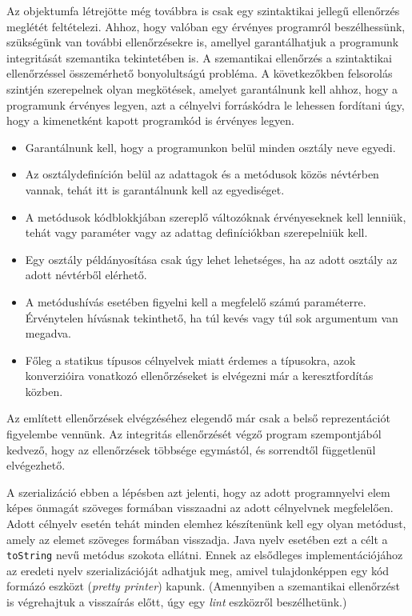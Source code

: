 
Az objektumfa létrejötte még továbbra is csak egy szintaktikai jellegű ellenőrzés meglétét feltételezi. Ahhoz, hogy valóban egy érvényes programról beszélhessünk, szükségünk van további ellenőrzésekre is, amellyel garantálhatjuk a programunk integritását szemantika tekintetében is. A szemantikai ellenőrzés a szintaktikai ellenőrzéssel összemérhető bonyolultságú probléma. A következőkben felsorolás szintjén szerepelnek olyan megkötések, amelyet garantálnunk kell ahhoz, hogy a programunk érvényes legyen, azt a célnyelvi forráskódra le lehessen fordítani úgy, hogy a kimenetként kapott programkód is érvényes legyen.
\begin{itemize}
\item Garantálnunk kell, hogy a programunkon belül minden osztály neve egyedi.
\item Az osztálydefiníción belül az adattagok és a metódusok közös névtérben vannak, tehát itt is garantálnunk kell az egyediséget.
\item A metódusok kódblokkjában szereplő változóknak érvényeseknek kell lenniük, tehát vagy paraméter vagy az adattag definíciókban szerepelniük kell.
\item Egy osztály példányosítása csak úgy lehet lehetséges, ha az adott osztály az adott névtérből elérhető.
\item A metódushívás esetében figyelni kell a megfelelő számú paraméterre. Érvénytelen hívásnak tekinthető, ha túl kevés vagy túl sok argumentum van megadva.
\item Főleg a statikus típusos célnyelvek miatt érdemes a típusokra, azok konverzióira vonatkozó ellenőrzéseket is elvégezni már a keresztfordítás közben.
\end{itemize}

Az említett ellenőrzések elvégzéséhez elegendő már csak a belső reprezentációt figyelembe vennünk. Az integritás ellenőrzését végző program szempontjából kedvező, hogy az ellenőrzések többsége egymástól, és sorrendtől függetlenül elvégezhető.


A szerializáció ebben a lépésben azt jelenti, hogy az adott programnyelvi elem képes önmagát szöveges formában visszaadni az adott célnyelvnek megfelelően. Adott célnyelv esetén tehát minden elemhez készítenünk kell egy olyan metódust, amely az elemet szöveges formában visszadja. Java nyelv esetében ezt a célt a \texttt{toString} nevű metódus szokota ellátni. Ennek az elsődleges implementációjához az eredeti nyelv szerializációját adhatjuk meg, amivel tulajdonképpen egy kód formázó eszközt (\textit{pretty printer}) kapunk. (Amennyiben a szemantikai ellenőrzést is végrehajtuk a visszaírás előtt, úgy egy \textit{lint} eszközről beszélhetünk.)

